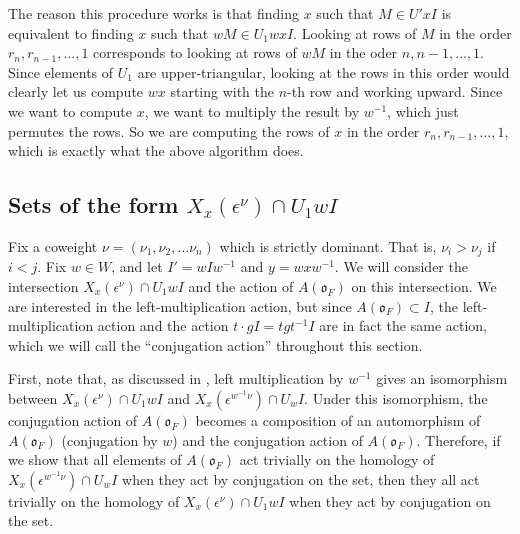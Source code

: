 \documentclass{amsart}
\theoremstyle{definition}
\def\O{\mathfrak{o}}
\def\e{\epsilon}
\def\A{A(\O_F)}
\def\en{\e^{\nu}}
\def\X{X_x(\en)}
\def\Xw{X_x(\e^{w^{-1}\nu})}
\begin{document}
  The reason this procedure works is that finding $x$ such that $M \in U'xI$ is
  equivalent to finding $x$ such that $wM \in U_1 wxI$.  Looking at rows of $M$
  in the order $r_n, r_{n-1}, \ldots, 1$ corresponds to looking at rows of $wM$
  in the oder $n, n-1, \ldots, 1$.  Since elements of $U_1$ are
  upper-triangular, looking at the rows in this order would clearly let us
  compute $wx$ starting with the $n$-th row and working upward.  Since we want
  to compute $x$, we want to multiply the result by $w^{-1}$, which just
  permutes the rows.  So we are computing the rows of $x$ in the order $r_n,
  r_{n-1}, \ldots, 1$, which is exactly what the above algorithm does.

  \subsection{Sets of the form $\X \cap U_1 wI$}
  \label{sec:U-orbits}
  Fix a coweight $\nu = (\nu_1, \nu_2, \ldots \nu_n)$ which is strictly
  dominant.  That is, $\nu_i > \nu_j$ if $i < j$.  Fix $w \in W$, and let $I' =
  w I w^{-1}$ and $y = w x w^{-1}$.  We will consider the intersection $\X \cap
  U_1 wI$ and the action of $\A$ on this intersection.  We are interested in
  the left-multiplication action, but since $\A \subset I$, the
  left-multiplication action and the action $t \cdot gI = tgt^{-1}I$ are in
  fact the same action, which we will call the ``conjugation action''
  throughout this section.

  First, note that, as discussed in \cite{Kottwitz-f_nu}, left multiplication
  by $w^{-1}$ gives an isomorphism between $\X \cap U_1 wI$ and $\Xw \cap U_w
  I$.  Under this isomorphism, the conjugation action of $\A$ becomes a
  composition of an automorphism of $\A$ (conjugation by $w$) and the
  conjugation action of $\A$.  Therefore, if we show that all elements of $\A$
  act trivially on the homology of $\Xw \cap U_w I$ when they act by
  conjugation on the set, then they all act trivially on the homology of $\X
  \cap U_1 wI$ when they act by conjugation on the set.
  
\end{document}
